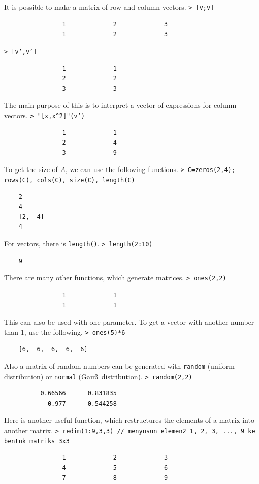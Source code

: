 \documentclass[11pt, a4paper]{article}
\newcommand{\emtcmd}[1]{\noindent\texttt{\textcolor{emtcommand}{>}\ #1}\par\smallskip}
\begin{document}
It is possible to make a matrix of row and column vectors.
\emtcmd{[v;v]}
\begin{verbatim}
                1             2             3
                1             2             3
\end{verbatim}
\emtcmd{[v',v']}
\begin{verbatim}
                1             1
                2             2
                3             3
\end{verbatim}

The main purpose of this is to interpret a vector of expressions for column vectors.
\emtcmd{"[x,x\^{}2]"(v')}
\begin{verbatim}
                1             1
                2             4
                3             9
\end{verbatim}

To get the size of $A$, we can use the following functions.
\emtcmd{C=zeros(2,4); rows(C), cols(C), size(C), length(C)}
\begin{verbatim}
    2
    4
    [2,  4]
    4
\end{verbatim}

For vectors, there is \texttt{length()}.
\emtcmd{length(2:10)}
\begin{verbatim}
    9
\end{verbatim}

There are many other functions, which generate matrices.
\emtcmd{ones(2,2)}
\begin{verbatim}
                1             1
                1             1
\end{verbatim}

This can also be used with one parameter. To get a vector with another number than 1, use the following.
\emtcmd{ones(5)*6}
\begin{verbatim}
    [6,  6,  6,  6,  6]
\end{verbatim}

Also a matrix of random numbers can be generated with \texttt{random} (uniform distribution) or \texttt{normal} (Gau\ss\ distribution).
\emtcmd{random(2,2)}
\begin{verbatim}
          0.66566      0.831835
            0.977      0.544258
\end{verbatim}

Here is another useful function, which restructures the elements of a matrix into another matrix.
\emtcmd{redim(1:9,3,3) \textcolor{emtcomment}{// menyusun elemen2 1, 2, 3, ..., 9 ke bentuk matriks 3x3}}
\begin{verbatim}
                1             2             3
                4             5             6
                7             8             9
\end{verbatim}
\end{document}
